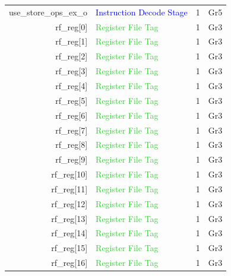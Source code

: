 \begin{table}
\begin{tabular}{rlcc}
        use\_store\_ops\_ex\_o          & \textcolor{blue}{Instruction Decode Stage}        & 1    & Gr5   \\\hdashline
        rf\_reg[0]                      & \textcolor{LimeGreen}{Register File Tag}          & 1    & Gr3   \\
        rf\_reg[1]                      & \textcolor{LimeGreen}{Register File Tag}          & 1    & Gr3   \\
        rf\_reg[2]                      & \textcolor{LimeGreen}{Register File Tag}          & 1    & Gr3   \\
        rf\_reg[3]                      & \textcolor{LimeGreen}{Register File Tag}          & 1    & Gr3   \\
        rf\_reg[4]                      & \textcolor{LimeGreen}{Register File Tag}          & 1    & Gr3   \\
        rf\_reg[5]                      & \textcolor{LimeGreen}{Register File Tag}          & 1    & Gr3   \\
        rf\_reg[6]                      & \textcolor{LimeGreen}{Register File Tag}          & 1    & Gr3   \\
        rf\_reg[7]                      & \textcolor{LimeGreen}{Register File Tag}          & 1    & Gr3   \\
        rf\_reg[8]                      & \textcolor{LimeGreen}{Register File Tag}          & 1    & Gr3   \\
        rf\_reg[9]                      & \textcolor{LimeGreen}{Register File Tag}          & 1    & Gr3   \\
        rf\_reg[10]                     & \textcolor{LimeGreen}{Register File Tag}          & 1    & Gr3   \\
        rf\_reg[11]                     & \textcolor{LimeGreen}{Register File Tag}          & 1    & Gr3   \\
        rf\_reg[12]                     & \textcolor{LimeGreen}{Register File Tag}          & 1    & Gr3   \\
        rf\_reg[13]                     & \textcolor{LimeGreen}{Register File Tag}          & 1    & Gr3   \\
        rf\_reg[14]                     & \textcolor{LimeGreen}{Register File Tag}          & 1    & Gr3   \\
        rf\_reg[15]                     & \textcolor{LimeGreen}{Register File Tag}          & 1    & Gr3   \\
        rf\_reg[16]                     & \textcolor{LimeGreen}{Register File Tag}          & 1    & Gr3   \\

\end{tabular}
\end{table}
